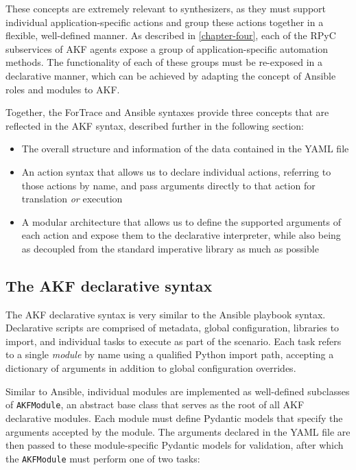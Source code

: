 \documentclass[letterpaper,12pt]{report}
\def\tightlist{}
\newcommand{\passthrough}[1]{#1}
\begin{document}
These concepts are extremely relevant to synthesizers, as they must
support individual application-specific actions and group these actions
together in a flexible, well-defined manner. As described in
\autoref{chapter-four}, each of the RPyC subservices of AKF
agents expose a group of application-specific automation methods. The
functionality of each of these groups must be re-exposed in a
declarative manner, which can be achieved by adapting the concept of
Ansible roles and modules to AKF.

Together, the ForTrace and Ansible syntaxes provide three concepts that
are reflected in the AKF syntax, described further in the following
section:

\begin{itemize}
\tightlist
\item
  The overall structure and information of the data contained in the
  YAML file
\item
  An action syntax that allows us to declare individual actions,
  referring to those actions by name, and pass arguments directly to
  that action for translation \emph{or} execution
\item
  A modular architecture that allows us to define the supported
  arguments of each action and expose them to the declarative
  interpreter, while also being as decoupled from the standard
  imperative library as much as possible
\end{itemize}

\subsection{The AKF declarative
syntax}\label{the-akf-declarative-syntax}

The AKF declarative syntax is very similar to the Ansible playbook
syntax. Declarative scripts are comprised of metadata, global
configuration, libraries to import, and individual tasks to execute as
part of the scenario. Each task refers to a single \emph{module} by name
using a qualified Python import path, accepting a dictionary of
arguments in addition to global configuration overrides.

Similar to Ansible, individual modules are implemented as well-defined
subclasses of \passthrough{\lstinline!AKFModule!}, an abstract base
class that serves as the root of all AKF declarative modules. Each
module must define Pydantic models that specify the arguments accepted
by the module. The arguments declared in the YAML file are then passed
to these module-specific Pydantic models for validation, after which the
\passthrough{\lstinline!AKFModule!} must perform one of two tasks:
\end{document}
